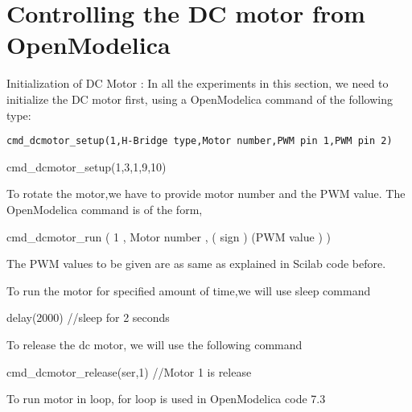 \section{Controlling the DC motor from OpenModelica}


Initialization of DC Motor : 
In all the experiments in this section, we need to initialize the DC motor first, using
a OpenModelica command of the following type:

\begin{lstlisting}[style=nonumbers]
  cmd_dcmotor_setup(1,H-Bridge type,Motor number,PWM pin 1,PWM pin 2)
\end{lstlisting}
cmd\_dcmotor\_setup(1,3,1,9,10)

To rotate the motor,we have to provide motor number
and the PWM value. The OpenModelica command is of the form,

cmd\_dcmotor\_run ( 1 , Motor number , ( sign ) (PWM value ) )

The PWM values to be given are as same as explained in Scilab code before.

To run the motor for specified amount of time,we will use sleep command

delay(2000) //sleep for 2 seconds

To release the dc motor, we will use the following command

cmd\_dcmotor\_release(ser,1) //Motor 1 is release

To run motor in loop, for loop is used in OpenModelica code 7.3



